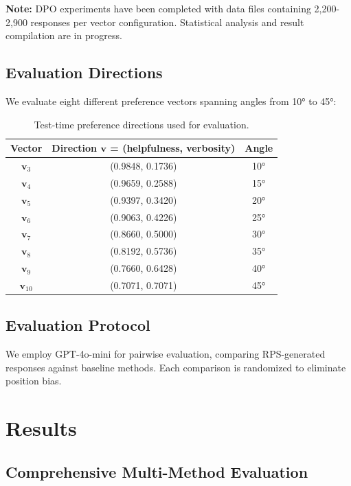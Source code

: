 \documentclass{article} %
\begin{document}
\textbf{Note:} DPO experiments have been completed with data files containing 2,200-2,900 responses per vector configuration. Statistical analysis and result compilation are in progress.

\subsection{Evaluation Directions}
We evaluate eight different preference vectors spanning angles from 10° to 45°:

\begin{table}[H]
\centering
\caption{Test-time preference directions used for evaluation.}
\label{tab:directions}
\begin{tabular}{c|c|c}
\toprule
\textbf{Vector} & \textbf{Direction $\mathbf{v}$ = (helpfulness, verbosity)} & \textbf{Angle} \\
\midrule
$\mathbf{v}_3$ & (0.9848, 0.1736) & 10° \\
$\mathbf{v}_4$ & (0.9659, 0.2588) & 15° \\
$\mathbf{v}_5$ & (0.9397, 0.3420) & 20° \\
$\mathbf{v}_6$ & (0.9063, 0.4226) & 25° \\
$\mathbf{v}_7$ & (0.8660, 0.5000) & 30° \\
$\mathbf{v}_8$ & (0.8192, 0.5736) & 35° \\
$\mathbf{v}_9$ & (0.7660, 0.6428) & 40° \\
$\mathbf{v}_{10}$ & (0.7071, 0.7071) & 45° \\
\bottomrule
\end{tabular}
\end{table}

\subsection{Evaluation Protocol}
We employ GPT-4o-mini for pairwise evaluation, comparing RPS-generated responses against baseline methods. Each comparison is randomized to eliminate position bias.

\section{Results}

\subsection{Comprehensive Multi-Method Evaluation}
\end{document}
